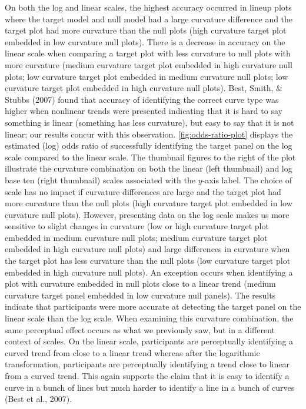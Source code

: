 \documentclass[print]{nuthesis}
\begin{document}
On both the log and linear scales, the highest accuracy occurred in lineup plots where the target model and null model had a large curvature difference and the target plot had more curvature than the null plots (high curvature target plot embedded in low curvature null plots).
There is a decrease in accuracy on the linear scale when comparing a target plot with less curvature to null plots with more curvature (medium curvature target plot embedded in high curvature null plots; low curvature target plot embedded in medium curvature null plots; low curvature target plot embedded in high curvature null plots).
Best, Smith, \& Stubbs (2007) found that accuracy of identifying the correct curve type was higher when nonlinear trends were presented indicating that it is hard to say something is linear (something has less curvature), but easy to say that it is not linear; our results concur with this observation.
\cref{fig:odds-ratio-plot} displays the estimated (log) odds ratio of successfully identifying the target panel on the log scale compared to the linear scale. The thumbnail figures to the right of the plot illustrate the curvature combination on both the linear (left thumbnail) and log base ten (right thumbnail) scales associated with the \(y\)-axis label.
The choice of scale has no impact if curvature differences are large and the target plot had more curvature than the null plots (high curvature target plot embedded in low curvature null plots).
However, presenting data on the log scale makes us more sensitive to slight changes in curvature (low or high curvature target plot embedded in medium curvature null plots; medium curvature target plot embedded in high curvature null plots) and large differences in curvature when the target plot has less curvature than the null plots (low curvature target plot embedded in high curvature null plots).
An exception occurs when identifying a plot with curvature embedded in null plots close to a linear trend (medium curvature target panel embedded in low curvature null panels).
The results indicate that participants were more accurate at detecting the target panel on the linear scale than the log scale.
When examining this curvature combination, the same perceptual effect occurs as what we previously saw, but in a different context of scales.
On the linear scale, participants are perceptually identifying a curved trend from close to a linear trend whereas after the logarithmic transformation, participants are perceptually identifying a trend close to linear from a curved trend.
This again supports the claim that it is easy to identify a curve in a bunch of lines but much harder to identify a line in a bunch of curves (Best et al., 2007).
\end{document}
